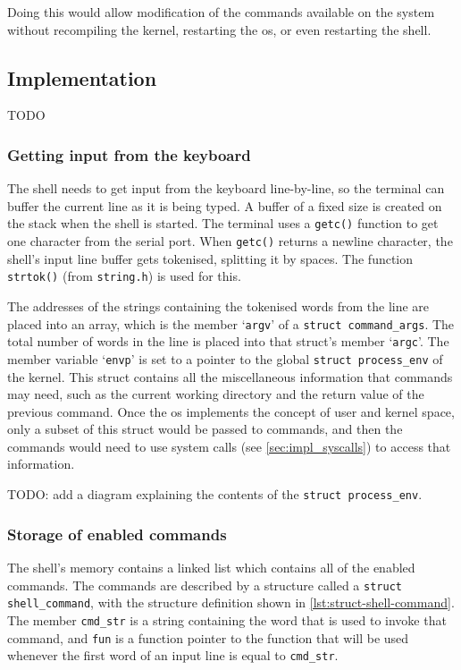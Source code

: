 \documentclass{article}
\begin{document}
Doing this would allow modification of the commands available on the system
without recompiling the kernel, restarting the \gls{os}, or even restarting the
shell.


\subsection{Implementation}
TODO

\subsubsection{Getting input from the keyboard}
The shell needs to get input from the keyboard line-by-line, so the terminal
can buffer the current line as it is being typed. A buffer of a fixed size is
created on the stack when the shell is started. The terminal uses a
\texttt{getc()} function to get one character from the serial port. When
\texttt{getc()} returns a newline character, the shell's input line buffer gets
tokenised, splitting it by spaces. The function \texttt{strtok()} (from
\texttt{string.h}) is used for this.

The addresses of the strings containing the tokenised words from the line are
placed into an array, which is the member `\texttt{argv}' of a \texttt{struct
command\_args}. The total number of words in the line is placed into that
struct's member `\texttt{argc}'. The member variable `\texttt{envp}' is set to
a pointer to the global \texttt{struct process\_env} of the kernel. This struct
contains all the miscellaneous information that commands may need, such as the
current working directory and the return value of the previous command. Once
the \gls{os} implements the concept of user and kernel space, only a subset of
this struct would be passed to commands, and then the commands would need to
use system calls (see \autoref{sec:impl_syscalls}) to access that information.

TODO: add a diagram explaining the contents of the \texttt{struct
process\_env}.

\subsubsection{Storage of enabled commands}
The shell's memory contains a linked list which contains all of the enabled
commands. The commands are described by a structure called a \texttt{struct
shell\_command}, with the structure definition shown in
\autoref{lst:struct-shell-command}. The member \verb!cmd_str! is a string
containing the word that is used to invoke that command, and \verb!fun! is a
function pointer to the function that will be used whenever the first word of
an input line is equal to \verb!cmd_str!.
\end{document}
